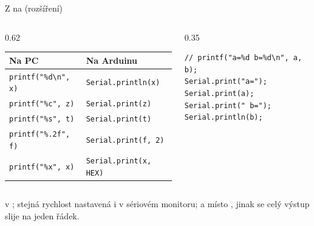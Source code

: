 \documentclass[12pt,aspectratio=169]{beamer}
\newcommand{\roz}{ {\normalfont\footnotesize\textcolor{SPSGrey}{(rozšíření)}}}
\begin{document}
\begin{frame}[fragile]{Z  na \roz}
  \begin{columns}[T]
    \begin{column}{0.62\textwidth}
      \scriptsize
      \begin{tabular}{@{}p{3.1cm}p{3.5cm}@{}}
        \toprule
        Na PC & Na Arduinu \\
        \midrule
        \texttt{printf("\%d\textbackslash n", x)} & \texttt{Serial.println(x)} \\
        \texttt{printf("\%c", z)}    & \texttt{Serial.print(z)} \\
        \texttt{printf("\%s", t)}    & \texttt{Serial.print(t)} \\
        \texttt{printf("\%.2f", f)}  & \texttt{Serial.print(f, 2)} \\
        \texttt{printf("\%x", x)}    & \texttt{Serial.print(x, HEX)} \\
        \bottomrule
      \end{tabular}
    \end{column}
    \begin{column}{0.35\textwidth}
\begin{lstlisting}[style=arduino_bez_cisel]
// printf("a=%d b=%d\n", a, b);
Serial.print("a=");
Serial.print(a);
Serial.print(" b=");
Serial.println(b);
\end{lstlisting}
    \end{column}
  \end{columns}
  \vspace{1mm}
  \footnotesize
    v ;
  stejná rychlost nastavená i v sériovém monitoru; a  místo ,
  jinak se celý výstup slije na jeden řádek.
\end{frame}
\end{document}
